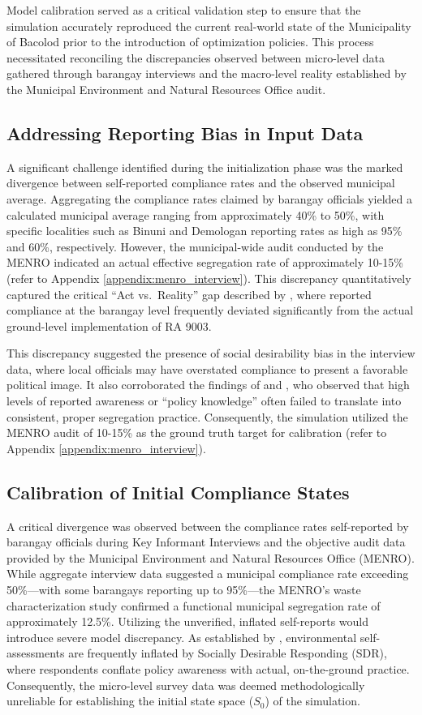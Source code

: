 Model calibration served as a critical validation step to ensure that the simulation accurately reproduced the current real-world state of the Municipality of Bacolod prior to the introduction of optimization policies. This process necessitated reconciling the discrepancies observed between micro-level data gathered through barangay interviews and the macro-level reality established by the Municipal Environment and Natural Resources Office audit.

\subsection{Addressing Reporting Bias in Input Data}
A significant challenge identified during the initialization phase was the marked divergence between self-reported compliance rates and the observed municipal average. Aggregating the compliance rates claimed by barangay officials yielded a calculated municipal average ranging from approximately 40\% to 50\%, with specific localities such as Binuni and Demologan reporting rates as high as 95\% and 60\%, respectively. However, the municipal-wide audit conducted by the MENRO indicated an actual effective segregation rate of approximately 10-15\% (refer to Appendix \ref{appendix:menro_interview}). This discrepancy quantitatively captured the critical ``Act vs.\ Reality'' gap described by \cite{Yazawa2025}, where reported compliance at the barangay level frequently deviated significantly from the actual ground-level implementation of RA 9003. 

This discrepancy suggested the presence of social desirability bias in the interview data, where local officials may have overstated compliance to present a favorable political image. It also corroborated the findings of \cite{Abordo2025} and \cite{Dalugdog2021}, who observed that high levels of reported awareness or ``policy knowledge'' often failed to translate into consistent, proper segregation practice. Consequently, the simulation utilized the MENRO audit of 10-15\% as the ground truth target for calibration (refer to Appendix \ref{appendix:menro_interview}).

\subsection{Calibration of Initial Compliance States}
A critical divergence was observed between the compliance rates self-reported by barangay officials during Key Informant Interviews and the objective audit data provided by the Municipal Environment and Natural Resources Office (MENRO). While aggregate interview data suggested a municipal compliance rate exceeding 50\%—with some barangays reporting up to 95\%—the MENRO’s waste characterization study confirmed a functional municipal segregation rate of approximately 12.5\%. Utilizing the unverified, inflated self-reports would introduce severe model discrepancy. As established by \cite{Geiger2021}, environmental self-assessments are frequently inflated by Socially Desirable Responding (SDR), where respondents conflate policy awareness with actual, on-the-ground practice. Consequently, the micro-level survey data was deemed methodologically unreliable for establishing the initial state space ($S_0$) of the simulation.

